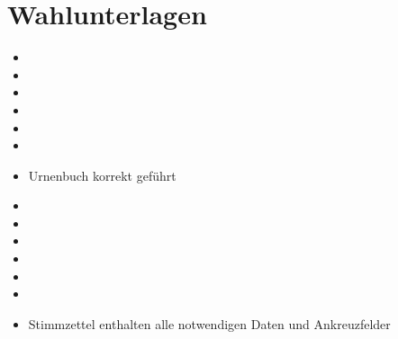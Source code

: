 \documentclass[a4paper]{scrartcl}
\newcommand{\fullcheck}{\raisebox{-.8\dp\strutbox}{\texttt{[image: Check.pdf]}}}
\newcommand{\semicheck}{\raisebox{-.8\dp\strutbox}{\texttt{[image: Semicheck.pdf]}}}
\newcommand{\nocheck}{\raisebox{-.8\dp\strutbox}{\texttt{[image: Nocheck.pdf]}}}
\newcommand{\dontknow}{\raisebox{-.8\dp\strutbox}{\texttt{[image: Dontknow.pdf]}}}
\newcommand{\notrev}{\raisebox{-.8\dp\strutbox}{\texttt{[image: Notrev.pdf]}}}
\newcommand{\sym}[1]{
\ifcase#1 \item[$\Box$]
\or \item[\fullcheck]
\or \item[\semicheck]
\or \item[\nocheck]
\or \item[\dontknow]
\or \item[\notrev]
\else \item[$\Box$]
\fi}
\begin{document}








\section{Wahlunterlagen}
\begin{itemize}[label=$\Box$]
\sym{4} Urnenbuch korrekt geführt
\sym{1} Stimmzettel enthalten alle notwendigen Daten und Ankreuzfelder
\end{itemize}




\end{document}
